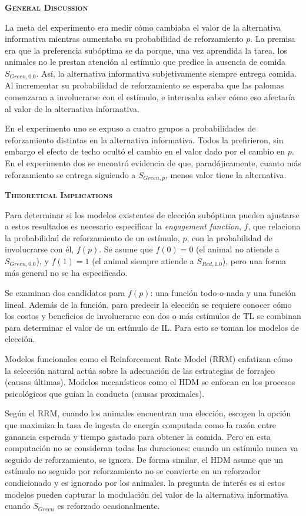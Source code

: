\documentclass[a4paper,12pt]{article}
\begin{document}
{\scshape\bfseries General Discussion}

La meta del experimento era medir cómo cambiaba el valor de la alternativa informativa mientras aumentaba su probabilidad de reforzamiento $p$. La premisa era que la preferencia subóptima se da porque, una vez aprendida la tarea, los animales no le prestan atención al estímulo que predice la ausencia de comida $S_{Green,0{.}0}$. Así, la alternativa informativa subjetivamente siempre entrega comida. Al incrementar su probabilidad de reforzamiento se esperaba que las palomas comenzaran a involucrarse con el estímulo, e interesaba saber cómo eso afectaría al valor de la alternativa informativa.

En el experimento uno se expuso a cuatro grupos a probabilidades de reforzamiento distintas en la alternativa informativa. Todos la prefirieron, sin embargo el efecto de techo ocultó el cambio en el valor dado por el cambio en $p$. En el experimento dos se encontró evidencia de que, paradójicamente, cuanto más reforzamiento se entrega siguiendo a $S_{Green,p}$, menos valor tiene la alternativa.

{\scshape\bfseries Theoretical Implications}

Para determinar si los modelos existentes de elección subóptima pueden ajustarse a estos resultados es necesario especificar la {\itshape engagement function}, $f$, que relaciona la probabilidad de reforzamiento de un estímulo, $p$, con la probabilidad de involucrarse con él, $f(p)$. Se asume que $f(0)=0$ (el animal no atiende a $S_{Green,0{.}0}$), y $f(1)=1$ (el animal siempre atiende a $S_{Red,1{.}0}$), pero una forma más general no se ha especificado.

Se examinan dos candidatos para $f(p)$: una función todo-o-nada y una función lineal. Además de la función, para predecir la elección se requiere conocer cómo los costos y beneficios de involucrarse con dos o más estímulos de TL se combinan para determinar el valor de un estímulo de IL. Para esto se toman los modelos de elección.

Modelos funcionales como el Reinforcement Rate Model (RRM) enfatizan cómo la selección natural actúa sobre la adecuación de las estrategias de forrajeo (causas últimas). Modelos mecanísticos como el HDM se enfocan en los procesos psicológicos que guían la conducta (causas proximales).

Según el RRM, cuando los animales encuentran una elección, escogen la opción que maximiza la tasa de ingesta de energía computada como la razón entre ganancia esperada y tiempo gastado para obtener la comida. Pero en esta computación no se consideran todas las duraciones: cuando un estímulo nunca va seguido de reforzamiento, se ignora. De forma similar, el HDM asume que un estímulo no seguido por reforzamiento no se convierte en un reforzador condicionado y es ignorado por los animales. la pregunta de interés es si estos modelos pueden capturar la modulación del valor de la alternativa informativa cuando $S_{Green}$ es reforzado ocasionalmente.
\end{document}
